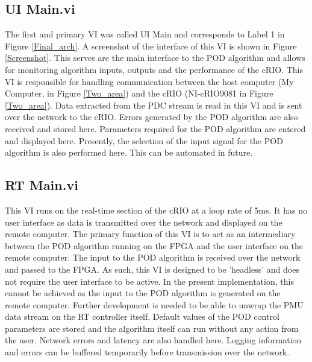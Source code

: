 \documentclass[conference]{IEEEtran}
\begin{document}
\subsection{UI Main.vi} The first and primary VI was called UI Main and corresponds to Label 1 in Figure \ref{Final_arch}. A screenshot of the interface of this VI is shown in Figure \ref{Screenshot}. This serves are the main interface to the POD algorithm and allows for monitoring algorithm inputs, outputs and the performance of the cRIO. This VI is responsible for handling communication between the host computer (My Computer, in Figure \ref{Two_area}) and the cRIO (NI-cRIO9081 in Figure \ref{Two_area}). Data extracted from the PDC stream is read in this VI and is sent over the network to the cRIO. Errors generated by the POD algorithm are also received and stored here. Parameters required for the POD algorithm are entered and displayed here. Presently, the selection of the input signal for the POD algorithm is also performed here. This can be automated in future.
\subsection{RT Main.vi}
This VI runs on the real-time section of the cRIO at a loop rate of 5ms. It has no user interface as data is transmitted over the network and displayed on the remote computer. The primary function of this VI is to act as an intermediary between the POD algorithm running on the FPGA and the user interface on the remote computer. The input to the POD algorithm is received over the network and passed to the FPGA. As such, this VI is designed to be 'headless' and does not require the user interface to be active. In the present implementation, this cannot be achieved as the input to the POD algorithm is generated on the remote computer. Further development is needed to be able to unwrap the PMU data stream on the RT controller itself. Default values of the POD control parameters are stored and the algorithm itself can run without any action from the user. Network errors and latency are also handled here. Logging information and errors can be buffered temporarily before transmission over the network.
\end{document}
